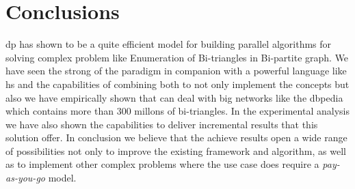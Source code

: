 \section{Conclusions}
\acrfull{dp} has shown to be a quite efficient model for building parallel algorithms for solving complex problem like Enumeration of Bi-triangles in Bi-partite graph.
We have seen the strong of the paradigm in companion with a powerful language like \acrfull{hs} and the capabilities of combining both to not only implement the concepts
but also we have empirically shown that can deal with big networks like the \acrlong{dbpedia} which contains more than $300$ millons of bi-triangles.
In the experimental analysis we have also shown the capabilities to deliver incremental results that this solution offer. 
In conclusion we believe that the achieve results open a wide range of possibilities not only to improve the existing framework and algorithm, as well as to implement 
other complex problems where the use case does require a \emph{pay-as-you-go} model.
